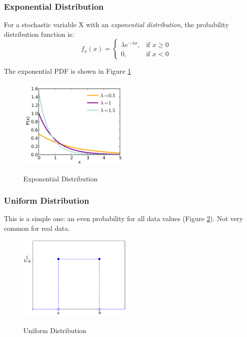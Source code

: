 \subsubsection{Exponential Distribution}

For a stochastic variable X with an \emph{exponential distribution}, the probability distribution function is:
\begin{equation}\label{eq_exponential}
f_x (x) =
  \begin{cases}
\lambda e^{- \lambda x}, & \mbox{if } x \ge 0 \\
0, & \mbox{if } x < 0
\end{cases}
\end{equation}

The exponential PDF is shown in Figure \ref{fig:exponential}
\begin{figure}
  \centering
  \includegraphics[width=0.5\textwidth]{../Images/Exponential_pdf.png}\\
  \caption{Exponential Distribution}\label{fig:exponential}
\end{figure}


\subsubsection{Uniform Distribution}

This is a simple one: an even probability for all data values (Figure \ref{fig:uniform}). Not very common for real data.

\begin{figure}
  \centering
  \includegraphics[width=0.5\textwidth]{../Images/Uniform_Distribution_PDF.png}\\
  \caption{Uniform Distribution} \label{fig:uniform}
\end{figure}

